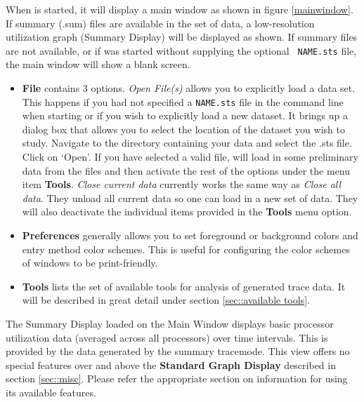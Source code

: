 \documentclass[10pt]{report}
\begin{document}
When \projections{} is started, it will display a main window as shown
in figure \ref{mainwindow}. If summary (.sum) files are available in
the set of data, a low-resolution utilization graph (Summary Display)
will be displayed as shown. If summary files are not available, or if
\projections{} was started without supplying the optional {\tt
NAME.sts} file, the main window will show a blank screen.


\begin{itemize}
\item
  {\bf File} contains 3 options. {\it Open File(s)} allows you to
  explicitly load a data set. This happens if you had not specified a
  {\tt NAME.sts} file in the command line when starting \projections{}
  or if you wish to explicitly load a new dataset. It brings up a
  dialog box that allows you to select the location of the dataset you
  wish to study. Navigate to the directory containing your data and
  select the .sts file.  Click on `Open'. If you have selected a valid
  file, \projections{} will load in some preliminary data from the
  files and then activate the rest of the options under the menu item
  {\bf Tools}. {\it Close current data} currently works the same way
  as {\it Close all data}. They unload all current \projections{} data
  so one can load in a new set of data. They will also deactivate the
  individual items provided in the {\bf Tools} menu option.
\item
  {\bf Preferences} generally allows you to set foreground or background
  colors and entry method color schemes. This is useful for configuring
  the color schemes of \projections{} windows to be print-friendly.
\item
  {\bf Tools} lists the set of available tools for analysis of generated
  trace data. It will be described in great detail under section
  \ref{sec::available tools}.
\end{itemize}


The Summary Display loaded on the Main Window displays basic processor
utilization data (averaged across all processors) over time
intervals. This is provided by the data generated by the summary
tracemode. This view offers no special features over and above the
{\bf Standard Graph Display} described in section \ref{sec::misc}. 
Please refer the appropriate section on information for using
its available features.

\end{document}
